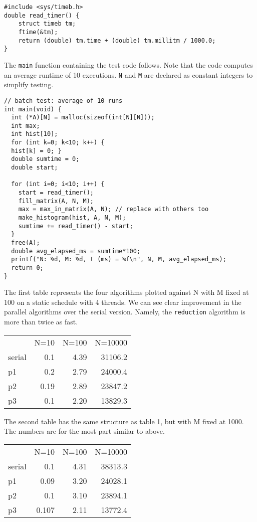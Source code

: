 \documentclass[11pt]{article}
\begin{document}
\begin{verbatim}
#include <sys/timeb.h>
double read_timer() {
    struct timeb tm;
    ftime(&tm);
    return (double) tm.time + (double) tm.millitm / 1000.0;
}
\end{verbatim}

The \verb~main~ function containing the test code follows. Note that the
code computes an average runtime of 10 executions. \verb~N~ and \verb~M~ are
declared as constant integers to simplify testing.

\begin{verbatim}
// batch test: average of 10 runs
int main(void) {
  int (*A)[N] = malloc(sizeof(int[N][N]));
  int max;
  int hist[10];
  for (int k=0; k<10; k++) {
  hist[k] = 0; }
  double sumtime = 0;
  double start;

  for (int i=0; i<10; i++) {
    start = read_timer();
    fill_matrix(A, N, M);
    max = max_in_matrix(A, N); // replace with others too
    make_histogram(hist, A, N, M);
    sumtime += read_timer() - start;
  }
  free(A);
  double avg_elapsed_ms = sumtime*100;
  printf("N: %d, M: %d, t (ms) = %f\n", N, M, avg_elapsed_ms);
  return 0;
}
\end{verbatim}

The first table represents the four algorithms plotted against N with
M fixed at 100 on a static schedule with 4 threads. We can see clear
improvement in the parallel algorithms over the serial
version. Namely, the \verb~reduction~ algorithm is more than twice as fast.

\begin{center}
\begin{tabular}{lrrr}
 & N=10 & N=100 & N=10000\\
serial & 0.1 & 4.39 & 31106.2\\
p1 & 0.2 & 2.79 & 24000.4\\
p2 & 0.19 & 2.89 & 23847.2\\
p3 & 0.1 & 2.20 & 13829.3\\
\end{tabular}
\end{center}


The second table has the same structure as table 1, but with M fixed
at 1000. The numbers are for the most part similar to above.

\begin{center}
\begin{tabular}{lrrr}
 & N=10 & N=100 & N=10000\\
serial & 0.1 & 4.31 & 38313.3\\
p1 & 0.09 & 3.20 & 24028.1\\
p2 & 0.1 & 3.10 & 23894.1\\
p3 & 0.107 & 2.11 & 13772.4\\
\end{tabular}
\end{center}
\end{document}
